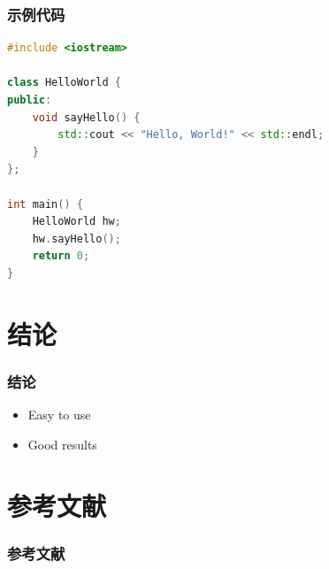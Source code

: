 \documentclass[10pt,aspectratio=169]{beamer}
\begin{document}
\begin{frame}[fragile]
\frametitle{示例代码}
\begin{lstlisting}[language=C++]
#include <iostream>

class HelloWorld {
public:
    void sayHello() {
        std::cout << "Hello, World!" << std::endl;
    }
};

int main() {
    HelloWorld hw;
    hw.sayHello();
    return 0;
}
\end{lstlisting}
\end{frame}

\section{结论}
\begin{frame}
	\frametitle{结论}

	\begin{itemize}
		\item Easy to use
		\item Good results
	\end{itemize}
\end{frame}

\section{参考文献}
\begin{frame}[allowframebreaks]%
    \frametitle{参考文献}
\end{frame}
\end{document}
